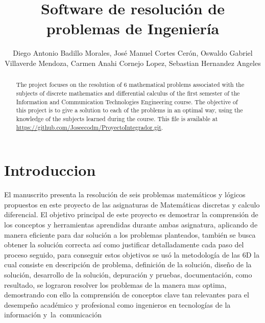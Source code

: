 \documentclass{IEEEcsmag}
\begin{document}

\title{Software de resolución de problemas de Ingeniería }

\author{Diego Antonio Badillo Morales, José Manuel Cortes Cerón, Oswaldo Gabriel Villaverde Mendoza, Carmen Anahi Cornejo Lopez, Sebastian Hernandez Angeles}



\begin{abstract}
The project focuses on the resolution of 6 mathematical problems associated with the subjects of discrete mathematics and differential calculus of the first semester of the Information and Communication Technologies Engineering course. The objective of this project is to give a solution to each of the problems in an optimal way, using the knowledge of the subjects learned during the course. This file is available at \href{https://github.com/Joseecodm/ProyectoIntegrador.git}{https://github.com/Joseecodm/ProyectoIntegrador.git}.
\end{abstract}

\maketitle

\section{Introduccion}

\chapteri El manuscrito presenta la resolución de seis problemas matemáticos y lógicos propuestos en este proyecto de las asignaturas de Matemáticas discretas y calculo diferencial.
\newline
\newline
El objetivo principal de este proyecto es demostrar la comprensión de los conceptos y herramientas aprendidas durante ambas asignatura, aplicando de manera eficiente para dar solución a los problemas planteados, también se busca obtener la solución correcta así como justificar detalladamente cada paso del proceso seguido, para conseguir estos objetivos se usó la metodología de las 6D la cual consiste en descripción de problema, definición de la solución, diseño de la solución, desarrollo de la solución, depuración y pruebas, documentación, como resultado, se lograron resolver los problemas de la manera mas optima, demostrando con ello la comprensión de conceptos clave tan relevantes para el desempeño académico y profesional como ingenieros en tecnologías de la información y la comunicación
\end{document}
